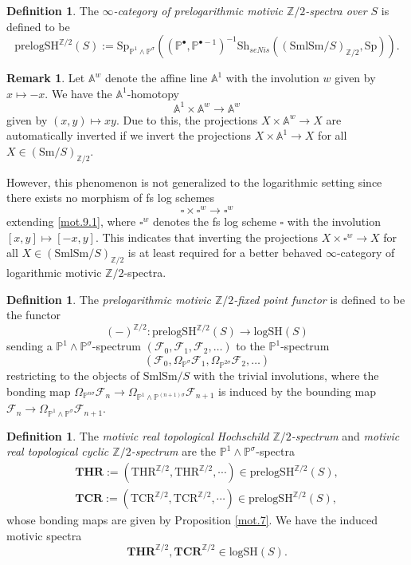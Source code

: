 \documentclass[10pt]{amsart}
\theoremstyle{definition}
\newtheorem{df}[thm]{Definition}
\newtheorem{rmk}[thm]{Remark}
\theoremstyle{remark}
\numberwithin{equation}{section}
\newcommand{\A}{\mathbb{A}}
\renewcommand{\P}{\mathbb{P}}
\newcommand{\Z}{\mathbb{Z}}
\newcommand{\cF}{\mathcal{F}}
\newcommand{\Sh}{\mathrm{Sh}}
\newcommand{\Sp}{\mathrm{Sp}}
\newcommand{\Sm}{\mathrm{Sm}}
\newcommand{\SmlSm}{\mathrm{SmlSm}}
\newcommand{\logSH}{\mathrm{logSH}}
\newcommand{\THR}{\mathrm{THR}}
\newcommand{\TCR}{\mathrm{TCR}}
\newcommand{\bTCR}{\mathbf{TCR}}
\newcommand{\bTHR}{\mathbf{THR}}
\newcommand{\prelogSH}{\mathrm{prelogSH}}
\newcommand{\Ztwo}{{\mathbb{Z}/2}}
\begin{document}
\begin{df}
\label{mot.8}
The \emph{$\infty$-category of prelogarithmic motivic $\Ztwo$-spectra over $S$} is defined to be
\[
\prelogSH^{\Ztwo}(S)
:=
\Sp_{\P^1\wedge \P^\sigma}
((\P^\bullet,\P^{\bullet-1})^{-1}\Sh_{seNis}((\SmlSm/S)_{\Ztwo},\Sp)).
\]
\end{df}


\begin{rmk}
\label{mot.9}
Let $\A^w$ denote the affine line $\A^1$ with the involution $w$ given by $x\mapsto -x$.
We have the $\A^1$-homotopy
\begin{equation}
\label{mot.9.1}
\A^1\times \A^w
\to
\A^w
\end{equation}
given by $(x,y)\mapsto xy$.
Due to this,
the projections
$X\times \A^w \to X$ are automatically inverted if we invert the projections $X\times \A^1\to X$ for all $X\in (\Sm/S)_{\Ztwo}$.

However,
this phenomenon is not generalized to the logarithmic setting since there exists no morphism of fs log schemes
\[
\square \times \square^w \to \square^w
\]
extending \eqref{mot.9.1},
where $\square^w$ denotes the fs log scheme $\square$ with the involution $[x,y]\mapsto [-x,y]$.
This indicates that inverting the projections $X\times \square^w\to X$ for all $X\in (\SmlSm/S)_{\Ztwo}$ is at least required for a better behaved $\infty$-category of logarithmic motivic $\Ztwo$-spectra.
\end{rmk}

\begin{df}
\label{mot.10}
The \emph{prelogarithmic motivic $\Ztwo$-fixed point functor} is defined to be the functor
\[
(-)^{\Ztwo}
\colon
\prelogSH^{\Ztwo}(S)
\to
\logSH(S)
\]
sending a $\P^1\wedge \P^\sigma$-spectrum $(\cF_0,\cF_1,\cF_2,\ldots)$ to the $\P^1$-spectrum
\[
(\cF_0,
\Omega_{\P^\sigma}\cF_1,
\Omega_{\P^{2\sigma}} \cF_2,\ldots
)
\]
restricting to the objects of $\SmlSm/S$ with the trivial involutions,
where the bonding map $\Omega_{\P^{n\sigma}}\cF_n\to \Omega_{\P^1\wedge\P^{(n+1)\sigma}}\cF_{n+1}$ is induced by the bounding map $\cF_n\to \Omega_{\P^1\wedge \P^\sigma}\cF_{n+1}$.
\end{df}

\begin{df}
\label{mot.11}
The \emph{motivic real topological Hochschild $\Ztwo$-spectrum} and \emph{motivic real topological cyclic $\Z/2$-spectrum} are the $\P^1\wedge \P^\sigma$-spectra
\begin{gather*}
\bTHR
:=
(\THR^{\Z/2},\THR^{\Z/2},\cdots)
\in
\prelogSH^{\Ztwo}(S),
\\
\bTCR
:=
(\TCR^{\Z/2},\TCR^{\Z/2},\cdots)
\in
\prelogSH^{\Ztwo}(S),
\end{gather*}
whose bonding maps are given by Proposition \ref{mot.7}.
We have the induced motivic spectra
\[
\bTHR^{\Ztwo},
\bTCR^{\Ztwo}
\in
\logSH(S).
\]
\end{df}
\end{document}
